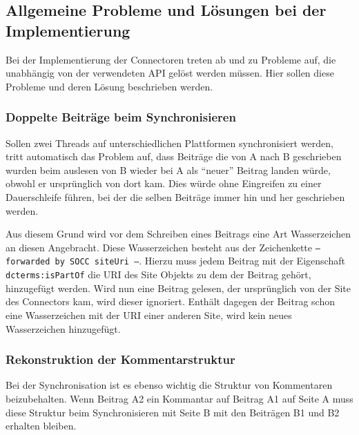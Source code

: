 
\subsection{Allgemeine Probleme und Lösungen bei der Implementierung} %
\label{sub:allgemeine_probleme}

Bei der Implementierung der Connectoren treten ab und zu Probleme auf, die unabhängig von der verwendeten API gelöst werden müssen. Hier sollen diese Probleme und deren Lösung beschrieben werden. 

\subsubsection{Doppelte Beiträge beim Synchronisieren} %
\label{ssub:doppelte_beitraege_beim_synchronisieren}

Sollen zwei Threads auf unterschiedlichen Plattformen synchronisiert werden, tritt automatisch das Problem auf, dass Beiträge die von A nach B geschrieben wurden beim auslesen von B wieder bei A als \enquote{neuer} Beitrag landen würde, obwohl er ursprünglich von dort kam. Dies würde ohne Eingreifen zu einer Dauerschleife führen, bei der die selben Beiträge immer hin und her geschrieben werden. 

Aus diesem Grund wird vor dem Schreiben eines Beitrags eine Art Wasserzeichen an diesen Angebracht. Diese Wasserzeichen besteht aus der Zeichenkette \texttt{--- forwarded by SOCC {siteUri} ---}. Hierzu muss jedem Beitrag mit der Eigenschaft \texttt{dcterms:isPartOf} die URI des Site Objekts zu dem der Beitrag gehört, hinzugefügt werden. Wird nun eine Beitrag gelesen, der ursprünglich von der Site des Connectors kam, wird dieser ignoriert. Enthält dagegen der Beitrag schon eine Wasserzeichen mit der URI einer anderen Site, wird kein neues Wasserzeichen hinzugefügt.


\subsubsection{Rekonstruktion der Kommentarstruktur} %
\label{ssub:rekonstruktion_der_kommentarstruktur}

Bei der Synchronisation ist es ebenso wichtig die Struktur von Kommentaren beizubehalten. Wenn Beitrag A2 ein Kommantar auf Beitrag A1 auf Seite A muss diese Struktur beim Synchronisieren mit Seite B mit den Beiträgen B1 und B2 erhalten bleiben.

